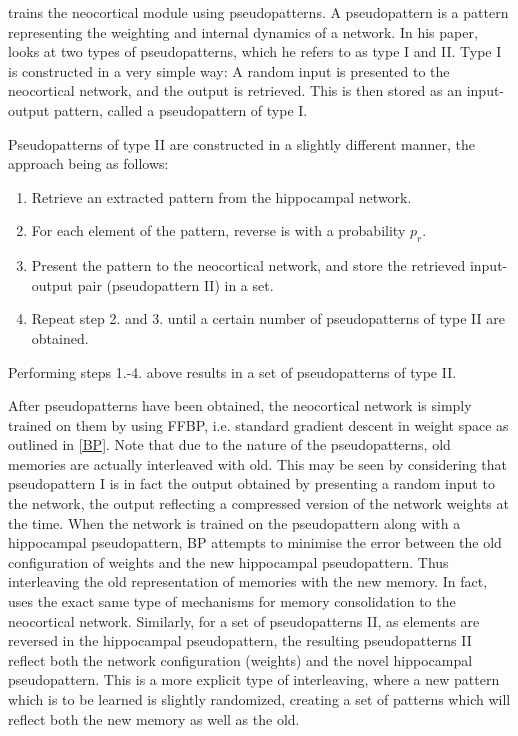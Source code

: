 \cite{Hattori2010} trains the neocortical module using pseudopatterns. A pseudopattern is a pattern representing the weighting and internal dynamics of a network. In his paper, \cite{Hattori2010} looks at two types of pseudopatterns, which he refers to as type I and II. Type I is constructed in a very simple way: A random input is presented to the neocortical network, and the output is retrieved. This is then stored as an input-output pattern, called a pseudopattern of type I.

Pseudopatterns of type II are constructed in a slightly different manner, the approach being as follows:

\begin{enumerate}
\item Retrieve an extracted pattern from the hippocampal network.
\item For each element of the pattern, reverse is with a probability $p_r$.
\item Present the pattern to the neocortical network, and store the retrieved input-output pair (pseudopattern II) in a set.
\item Repeat step 2. and 3. until a certain number of pseudopatterns of type II are obtained.
\end{enumerate}
Performing steps 1.-4. above results in a set of pseudopatterns of type II.

After pseudopatterns have been obtained, the neocortical network is simply trained on them by using FFBP, i.e. standard gradient descent in weight space as outlined in \ref{BP}. Note that due to the nature of the pseudopatterns, old memories are actually interleaved with old. This may be seen by considering that pseudopattern I is in fact the output obtained by presenting a random input to the network, the output reflecting a compressed version of the network weights at the time. When the network is trained on the pseudopattern along with a hippocampal pseudopattern, BP attempts to minimise the error between the old configuration of weights and the new hippocampal pseudopattern. Thus interleaving the old representation of memories with the new memory. In fact, \cite{Hattori2014} uses the exact same type of mechanisms for memory consolidation to the neocortical network.
Similarly, for a set of pseudopatterns II, as elements are reversed in the hippocampal pseudopattern, the resulting pseudopatterns II reflect both the network configuration (weights) and the novel hippocampal pseudopattern. This is a more explicit type of interleaving, where a new pattern which is to be learned is slightly randomized, creating a set of patterns which will reflect both the new memory as well as the old.

